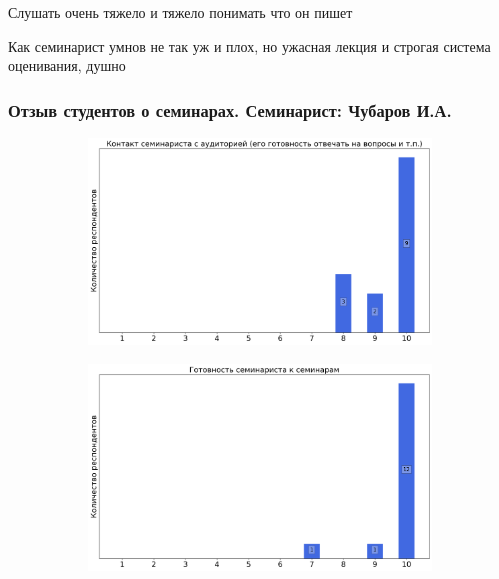             \begin{commentbox} 
                Слушать очень тяжело и тяжело понимать что он пишет  
            \end{commentbox} 
        
            \begin{commentbox} 
                Как семинарист умнов не так уж и плох, но ужасная лекция и строгая система оценивания, душно 
            \end{commentbox}
        
        
    \subsubsection{Отзыв студентов о семинарах. Семинарист: Чубаров И.А.}
        \begin{figure}[H]
            \centering
            \begin{subfigure}[b]{0.45\textwidth}
                \centering
                \includegraphics[width=\textwidth]{images/1 course/Аналитическая геометрия/seminarists-marks-Чубаров И.А.-0.png}
            \end{subfigure}
            \begin{subfigure}[b]{0.45\textwidth}
                \centering
                \includegraphics[width=\textwidth]{images/1 course/Аналитическая геометрия/seminarists-marks-Чубаров И.А.-1.png}

\end{subfigure}
\end{figure}

